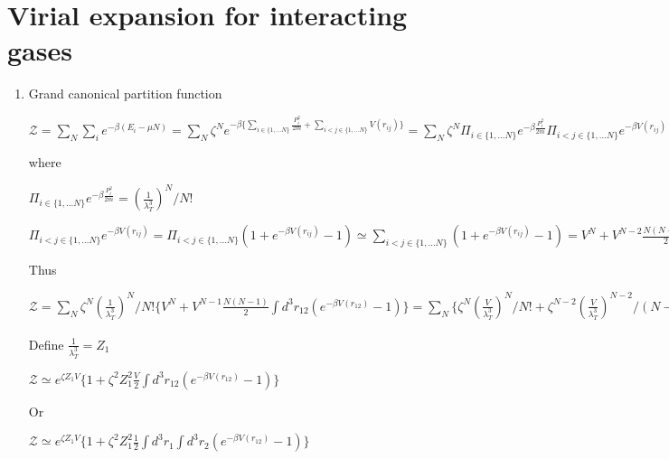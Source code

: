 \documentclass{article}
\begin{document}
    \section{Virial expansion for interacting
gases}\label{virial-expansion-for-interacting-gases}

    \begin{enumerate}
\def\labelenumi{(\alph{enumi})}
\itemsep1pt\parskip0pt
\item
  Grand canonical partition function


$\mathcal{Z} = \sum_N \sum_{i} e^{-\beta(E_{i}-\mu N)} = \sum_N \zeta^N  e^{-\beta \{ \sum_{i\in \{1,...N\}} \frac{P_{i}^2}{2m} + \sum_{i<j\in \{1,...N\} }V(r_{ij})\} } = \sum_N \zeta^N  \Pi_{i\in \{1,...N\}} e^{-\beta  \frac{P_{i}^2}{2m}} \Pi_{i<j\in \{1,...N \}}e^{ -\beta V(r_{ij})}$

where

$\Pi_{i\in \{1,...N\}} e^{-\beta  \frac{P_{i}^2}{2m}}  = (\frac{1}{\lambda_T^3})^N / N!$

$\Pi_{i<j\in \{1,...N\}}e^{ -\beta V(r_{ij})}= \Pi_{i<j\in \{1,...N\}}(1 + e^{ -\beta V(r_{ij})} -1) \simeq \sum_{i<j\in \{1,...N\}}(1 + e^{ -\beta V(r_{ij})} -1) = V^N + V^{N-2}  \frac{N(N-1)}{2}\int d^3r_1 \int d^3r_2 (e^{ -\beta V(r_{12})} -1)= V^N + V^{N-1}  \frac{N(N-1)}{2}\int d^3r_{12}  (e^{ -\beta V(r_{12})} -1) $

Thus

$\mathcal{Z} = \sum_N \zeta^N  (\frac{1}{\lambda_T^3})^N / N!\{V^N + V^{N-1}  \frac{N(N-1)}{2}\int d^3r_{12}  (e^{ -\beta V(r_{12})} -1)\} = \sum_N \{ \zeta^N  (\frac{V}{\lambda_T^3})^N / N!+ \zeta^{N-2}  (\frac{V}{\lambda_T^3})^{N-2} / (N-2)! (\zeta \frac{1}{\lambda_T^3})^2 \frac{V}{2}\int d^3r_{12}  (e^{ -\beta V(r_{12})} -1)\} = e^{\zeta \frac{V}{\lambda_T^3}}(1+ (\zeta  \frac{1}{\lambda_T^3})^2 \frac{V}{2 }\int d^3r_{12}  (e^{ -\beta V(r_{12})} -1) )$

Define $\frac{1}{\lambda_T^3}=Z_1$

$ \mathcal{Z}\simeq e^{\zeta Z_1 V}\{1+ \zeta^2  Z_1^2 \frac{V}{2 }  \int d^3r_{12}  (e^{ -\beta V(r_{12})} -1)\}$

Or

$ \mathcal{Z}\simeq e^{\zeta Z_1 V}\{1+ \zeta^2  Z_1^2 \frac{1}{2 }  \int d^3r_1 \int d^3r_2  (e^{ -\beta V(r_{12})} -1)\}$
\end{enumerate}
\end{document}
